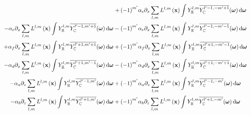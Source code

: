 \begin{align}
+\left({-1}\right)^{m'}&\alpha_c\partial_x\sum_{l,m}L^{l,m}\left (\boldsymbol{\mathbf{x}}\right)\int{Y_{\mathbb{R}}^{l,m}\overline{Y_{\mathbb{C}}^{l'-1, -m'+1}}(\boldsymbol{\mathbf{\omega}} )\,\mathrm{d}\boldsymbol{\mathbf{\omega}}}
\\
-\alpha_e\partial_x\sum_{l,m}L^{l,m}\left (\boldsymbol{\mathbf{x}}\right)\int{Y_{\mathbb{R}}^{l,m}\overline{Y_{\mathbb{C}}^{l'-1, m'+1}}(\boldsymbol{\mathbf{\omega}} )\,\mathrm{d}\boldsymbol{\mathbf{\omega}}}
-\left({-1}\right)^{m'}&\alpha_e\partial_x\sum_{l,m}L^{l,m}\left (\boldsymbol{\mathbf{x}}\right)\int{Y_{\mathbb{R}}^{l,m}\overline{Y_{\mathbb{C}}^{l'-1, -m'-1}}(\boldsymbol{\mathbf{\omega}} )\,\mathrm{d}\boldsymbol{\mathbf{\omega}}}
\\
+\alpha_f\partial_x\sum_{l,m}L^{l,m}\left (\boldsymbol{\mathbf{x}}\right)\int{Y_{\mathbb{R}}^{l,m}\overline{Y_{\mathbb{C}}^{l'+1, m'+1}}(\boldsymbol{\mathbf{\omega}} )\,\mathrm{d}\boldsymbol{\mathbf{\omega}}}
+\left({-1}\right)^{m'}&\alpha_f\partial_x\sum_{l,m}L^{l,m}\left (\boldsymbol{\mathbf{x}}\right)\int{Y_{\mathbb{R}}^{l,m}\overline{Y_{\mathbb{C}}^{l'+1, -m'-1}}(\boldsymbol{\mathbf{\omega}} )\,\mathrm{d}\boldsymbol{\mathbf{\omega}}}
\\
-\alpha_d\partial_x\sum_{l,m}L^{l,m}\left (\boldsymbol{\mathbf{x}}\right)\int{Y_{\mathbb{R}}^{l,m}\overline{Y_{\mathbb{C}}^{l'+1, m'-1}}(\boldsymbol{\mathbf{\omega}} )\,\mathrm{d}\boldsymbol{\mathbf{\omega}}}
-\left({-1}\right)^{m'}&\alpha_d\partial_x\sum_{l,m}L^{l,m}\left (\boldsymbol{\mathbf{x}}\right)\int{Y_{\mathbb{R}}^{l,m}\overline{Y_{\mathbb{C}}^{l'+1, -m'+1}}(\boldsymbol{\mathbf{\omega}} )\,\mathrm{d}\boldsymbol{\mathbf{\omega}}}
\\
-\alpha_a\partial_z\sum_{l,m}L^{l,m}\left (\boldsymbol{\mathbf{x}}\right)\int{Y_{\mathbb{R}}^{l,m}\overline{Y_{\mathbb{C}}^{l'-1, m'}}(\boldsymbol{\mathbf{\omega}} )\,\mathrm{d}\boldsymbol{\mathbf{\omega}}}
+\left({-1}\right)^{m'}&\alpha_a\partial_z\sum_{l,m}L^{l,m}\left (\boldsymbol{\mathbf{x}}\right)\int{Y_{\mathbb{R}}^{l,m}\overline{Y_{\mathbb{C}}^{l'-1, -m'}}(\boldsymbol{\mathbf{\omega}} )\,\mathrm{d}\boldsymbol{\mathbf{\omega}}}
\\
-\alpha_b\partial_z\sum_{l,m}L^{l,m}\left (\boldsymbol{\mathbf{x}}\right)\int{Y_{\mathbb{R}}^{l,m}\overline{Y_{\mathbb{C}}^{l'+1, m'}}(\boldsymbol{\mathbf{\omega}} )\,\mathrm{d}\boldsymbol{\mathbf{\omega}}}
+\left({-1}\right)^{m'}&\alpha_b\partial_z\sum_{l,m}L^{l,m}\left (\boldsymbol{\mathbf{x}}\right)\int{Y_{\mathbb{R}}^{l,m}\overline{Y_{\mathbb{C}}^{l'+1, -m'}}(\boldsymbol{\mathbf{\omega}} )\,\mathrm{d}\boldsymbol{\mathbf{\omega}}}
\end{align}

